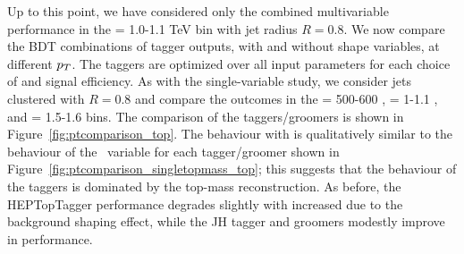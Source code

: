%


Up to this point, we have  considered only the combined multivariable performance in the \pt =  1.0-1.1 TeV bin with jet radius $R=0.8$. We now compare the BDT combinations of tagger outputs, with and without shape variables, at different $p_T$. The taggers are optimized over all input parameters for each choice of \pt and signal efficiency. As with the single-variable study, we consider \antikt jets clustered with $R=0.8$ and compare the outcomes in the \pt = 500-600 \GeV, \pt = 1-1.1 \TeV, and \pt = 1.5-1.6 \TeV bins. The comparison of the taggers/groomers is shown in Figure~\ref{fig:ptcomparison_top}. The behaviour with \pt is qualitatively similar to the behaviour of the \topmass~variable for each tagger/groomer shown in Figure~\ref{fig:ptcomparison_singletopmass_top}; this suggests that the \pt behaviour of the taggers is dominated by the top-mass reconstruction. As before, the HEPTopTagger performance degrades slightly with increased \pt due to the background shaping effect, while the JH tagger and groomers modestly improve in performance.

